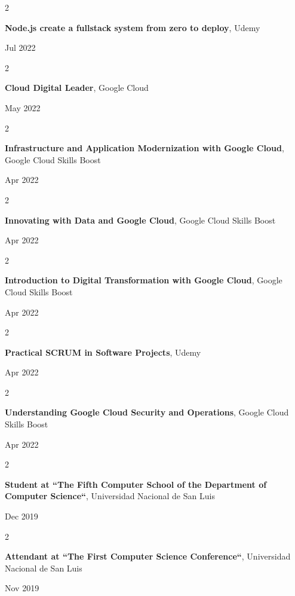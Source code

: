 \documentclass[10pt, letterpaper]{article}
\newenvironment{twocolentry}[2][]{
    \onecolentry
    \def\secondColumn{#2}
    \setcolumnwidth{\fill, 4.5 cm}
    \begin{paracol}{2}
}{
    \switchcolumn \raggedleft \secondColumn
    \end{paracol}
    \endonecolentry
} %
\begin{document}
    \begin{twocolentry}{
            Jul 2022
        }
        \textbf{Node.js create a fullstack system from zero to deploy}, Udemy
    \end{twocolentry}
    \begin{twocolentry}{
            May 2022
        }
        \textbf{Cloud Digital Leader}, Google Cloud
    \end{twocolentry}
    \begin{twocolentry}{
            Apr 2022
        }
        \textbf{Infrastructure and Application Modernization with Google Cloud}, Google Cloud Skills Boost
    \end{twocolentry}
    \begin{twocolentry}{
            Apr 2022
        }
        \textbf{Innovating with Data and Google Cloud}, Google Cloud Skills Boost
    \end{twocolentry}
    \begin{twocolentry}{
            Apr 2022
        }
        \textbf{Introduction to Digital Transformation with Google Cloud}, Google Cloud Skills Boost
    \end{twocolentry}
    \begin{twocolentry}{
            Apr 2022
        }
        \textbf{Practical SCRUM in Software Projects}, Udemy
    \end{twocolentry}
    \begin{twocolentry}{
            Apr 2022
        }
        \textbf{Understanding Google Cloud Security and Operations}, Google Cloud Skills Boost
    \end{twocolentry}
    \begin{twocolentry}{
            Dec 2019
        }
        \textbf{Student at “The Fifth Computer School of the Department of Computer Science“}, Universidad Nacional de San Luis
    \end{twocolentry}
    \begin{twocolentry}{
            Nov 2019
        }
        \textbf{Attendant at “The First Computer Science Conference“}, Universidad Nacional de San Luis
    \end{twocolentry}
\end{document}
